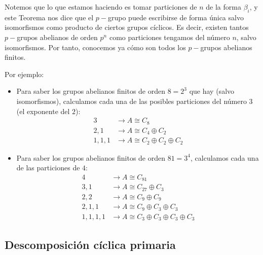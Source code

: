 \begin{observacion}
    Notemos que lo que estamos haciendo es tomar particiones de $n$ de la forma $\beta_i$, y este Teorema nos dice que el $p-$grupo puede escribirse de forma única salvo isomorfismos como producto de ciertos grupos cíclicos.\newline 
    Es decir, existen tantos $p-$grupos abelianos de orden $p^n$ como particiones tengamos del número $n$, salvo isomorfismos. Por tanto, conocemos ya cómo son todos los $p-$grupos abelianos finitos.
\end{observacion}

\begin{ejemplo}
    Por ejemplo:
    \begin{itemize}
        \item Para saber los grupos abelianos finitos de orden $8 = 2^3$ que hay (salvo isomorfismos), calculamos cada una de las posibles particiones del número 3 (el exponente del $2$):
            \begin{align*}
                3& \longrightarrow A\cong C_8 \\
                2, 1& \longrightarrow A\cong C_4\oplus C_2 \\
                1, 1, 1& \longrightarrow A\cong C_2 \oplus C_2 \oplus C_2
            \end{align*}
        \item Para saber los grupos abelianos finitos de orden $81 = 3^4$, calculamos cada una de las particiones de $4$:
            \begin{align*}
                4 &\longrightarrow A\cong C_{81} \\
                3, 1 &\longrightarrow A\cong C_{27} \oplus C_3 \\
                2, 2 &\longrightarrow A \cong C_{9} \oplus C_9 \\
                2, 1, 1 &\longrightarrow A \cong C_9 \oplus C_3 \oplus C_3 \\
                1, 1, 1, 1 &\longrightarrow A \cong C_3 \oplus C_3 \oplus C_3 \oplus C_3 
            \end{align*}
    \end{itemize}
\end{ejemplo}

\subsection{Descomposición cíclica primaria}

